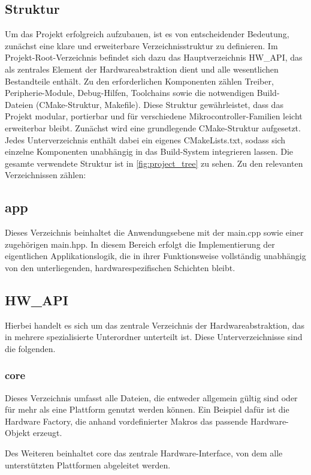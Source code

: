 \subsection{Struktur}
Um das Projekt erfolgreich aufzubauen, ist es von entscheidender Bedeutung, zunächst eine klare und erweiterbare Verzeichnisstruktur zu definieren. 
Im Projekt-Root-Verzeichnis befindet sich dazu das Hauptverzeichnis HW\_API, das als zentrales Element der Hardwareabstraktion dient und alle wesentlichen Bestandteile enthält. 
Zu den erforderlichen Komponenten zählen Treiber, Peripherie-Module, Debug-Hilfen, Toolchains sowie die notwendigen Build-Dateien (CMake-Struktur, Makefile). 
Diese Struktur gewährleistet, dass das Projekt modular, portierbar und für verschiedene Mikrocontroller-Familien leicht erweiterbar bleibt.
Zunächst wird eine grundlegende CMake-Struktur aufgesetzt. 
Jedes Unterverzeichnis enthält dabei ein eigenes CMakeLists.txt, sodass sich einzelne Komponenten unabhängig in das Build-System integrieren lassen. 
Die gesamte verwendete Struktur ist in \cref{fig:project_tree} zu sehen.
Zu den relevanten Verzeichnissen zählen:

\subsection*{app}
Dieses Verzeichnis beinhaltet die Anwendungsebene mit der main.cpp sowie einer zugehörigen main.hpp. 
In diesem Bereich erfolgt die Implementierung der eigentlichen Applikationslogik, die in ihrer Funktionsweise vollständig unabhängig von den unterliegenden, hardwarespezifischen Schichten bleibt.

\subsection*{HW\_API}
Hierbei handelt es sich um das zentrale Verzeichnis der Hardwareabstraktion, das in mehrere spezialisierte Unterordner unterteilt ist.
Diese Unterverzeichnisse sind die folgenden.

\subsubsection*{core}
Dieses Verzeichnis umfasst alle Dateien, die entweder allgemein gültig sind oder für mehr als eine Plattform genutzt werden können. 
Ein Beispiel dafür ist die Hardware Factory, die anhand vordefinierter Makros das passende Hardware-Objekt erzeugt.

Des Weiteren beinhaltet core das zentrale Hardware-Interface, von dem alle unterstützten Plattformen abgeleitet werden.

